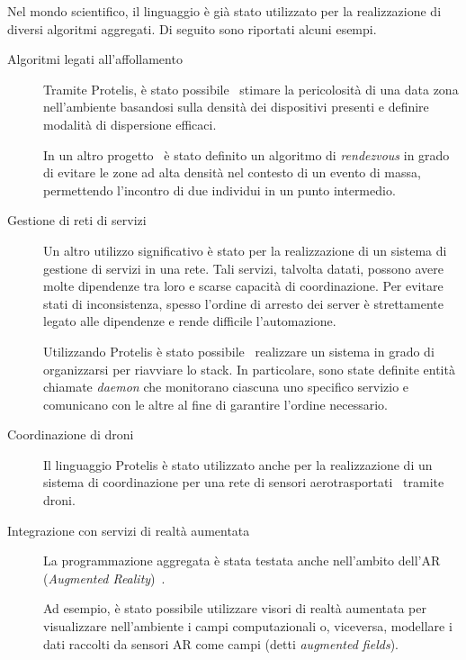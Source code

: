 Nel mondo scientifico, il linguaggio è già stato utilizzato per la realizzazione di diversi algoritmi aggregati.
Di seguito sono riportati alcuni esempi.

\begin{description}
  \item[Algoritmi legati all'affollamento]
    Tramite Protelis, è stato possibile~\cite{7274429} stimare la pericolosità di una data zona nell'ambiente basandosi sulla densità dei dispositivi presenti e definire modalità di dispersione efficaci.

    In un altro progetto~\cite{DBLP:journals/fgcs/CasadeiFPRSV19} è stato definito un algoritmo di \emph{rendezvous} in grado di evitare le zone ad alta densità nel contesto di un evento di massa, permettendo l'incontro di due individui in un punto intermedio.

  \item[Gestione di reti di servizi]
    Un altro utilizzo significativo è stato per la realizzazione di un sistema di gestione di servizi in una rete.
    Tali servizi, talvolta datati, possono avere molte dipendenze tra loro e scarse capacità di coordinazione.
    Per evitare stati di inconsistenza, spesso l'ordine di arresto dei server è strettamente legato alle dipendenze e rende difficile l'automazione.

    Utilizzando Protelis è stato possibile~\cite{7306601} realizzare un sistema in grado di organizzarsi per riavviare lo stack.
    In particolare, sono state definite entità chiamate \emph{daemon} che monitorano ciascuna uno specifico servizio e comunicano con le altre al fine di garantire l'ordine necessario.

  \item[Coordinazione di droni]
    Il linguaggio Protelis è stato utilizzato anche per la realizzazione di un sistema di coordinazione per una rete di sensori aerotrasportati~\cite{7536289,7789463} tramite droni.

  \item[Integrazione con servizi di realtà aumentata]
    La programmazione aggregata è stata testata anche nell'ambito dell'AR (\emph{Augmented Reality})~\cite{PCRV-SCOPES2015}.

    Ad esempio, è stato possibile utilizzare visori di realtà aumentata per visualizzare nell'ambiente i campi computazionali
    o, viceversa, modellare i dati raccolti da sensori AR come campi (detti \emph{augmented fields}).
\end{description}

